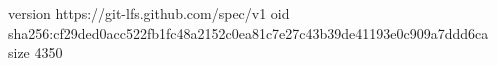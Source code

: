 version https://git-lfs.github.com/spec/v1
oid sha256:cf29ded0acc522fb1fc48a2152c0ea81c7e27c43b39de41193e0c909a7ddd6ca
size 4350
